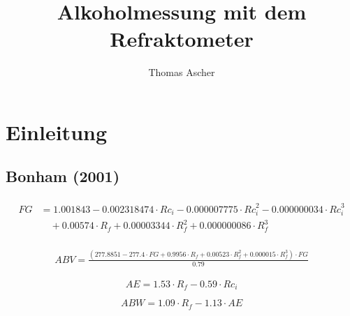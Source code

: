 \documentclass[a4paper,parskip=half]{scrartcl}
\title{Alkoholmessung mit dem Refraktometer}
\author{Thomas Ascher}
\begin{document}
\maketitle

\section*{Einleitung}

\autocite{Terrill2013}
\autocite{Novotny2017}
\autocite{Novotny2017a}
\autocite{Bonham2001}
\autocite{Gossett2012}
\autocite{Gossett2012a}
\autocite{Gossett2012b}
\autocite{Gossett2012c}
\autocite{Troester2012}
\autocite{Terrill2010}
\autocite{Terrill2010a}
\autocite{Terrill2011}
\autocite{Siebel1938}
\autocite{Weiss2016}
\autocite{BrewersJournal2017}
\autocite{Annemueller2015}
\autocite{Kunze2004}
\autocite{Narziss2009}

\newcommand{\rii}{\mathit{R}_i}
\newcommand{\riic}{\mathit{Rc}_i}
\newcommand{\rif}{\mathit{R}_f}
\newcommand{\rifc}{\mathit{Rc}_f}
\newcommand{\fg}{\mathit{FG}}
\newcommand{\abv}{\mathit{ABV}}
\newcommand{\abw}{\mathit{ABW}}

\subsection*{Bonham (2001)}

\begin{align}
\begin{split}
\fg &= 1.001843 - 0.002318474 \cdot \riic - 0.000007775 \cdot \riic^2 -
0.000000034 \cdot \riic^3 \\
& \quad + 0.00574 \cdot \rif +
0.00003344 \cdot \rif^2 + 0.000000086 \cdot \rif^3
\end{split} \label{eq:bonham} 
\end{align}

\begin{align}
\begin{split}
\abv = \frac{(277.8851 - 277.4 \cdot \fg + 0.9956 \cdot \rif + 0.00523 \cdot \rif^2 + 0.000015 \cdot \rif^3) \cdot \fg}{0.79}
\end{split}
\end{align}

\begin{equation}
\mathit{AE}=1.53 \cdot \rif - 0.59 \cdot \riic
\label{eq:gardner} 
\end{equation}

\begin{equation}
\abw = 1.09 \cdot \rif - 1.13 \cdot \mathit{AE}
\end{equation}
\end{document}
